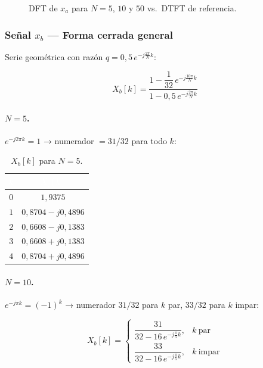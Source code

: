 \documentclass[../Main_Include.tex]{subfiles}
\begin{document}
\begin{figure}[H]
    \centering
    \caption{DFT de $x_a$ para $N = 5$, $10$ y $50$ vs.\ DTFT de referencia.}
\end{figure}

\subsubsection*{Señal $x_b$ — Forma cerrada general}

Serie geométrica con razón $q = 0{,}5\,e^{-j\frac{2\pi}{N}k}$:

\[
    \boxed{X_b[k] = \frac{1 - \dfrac{1}{32}\,e^{-j\frac{10\pi}{N}k}}
                        {1 - 0{,}5\,e^{-j\frac{2\pi}{N}k}}}
\]

\paragraph{$N = 5$.}
$e^{-j2\pi k} = 1$ → numerador $= 31/32$ para todo $k$:

\begin{table}[H]
\centering
\renewcommand{\arraystretch}{1.4}
\begin{tabular}{cc}
\toprule
\rowcolor{azulprinc}
\textcolor{white}{\textbf{$k$}} &
\textcolor{white}{\textbf{$X_b[k]$}} \\
\midrule
\rowcolor{grisclaro}
$0$ & $1{,}9375$ \\
$1$ & $0{,}8704 - j0{,}4896$ \\
\rowcolor{grisclaro}
$2$ & $0{,}6608 - j0{,}1383$ \\
$3$ & $0{,}6608 + j0{,}1383$ \\
\rowcolor{grisclaro}
$4$ & $0{,}8704 + j0{,}4896$ \\
\bottomrule
\end{tabular}
\caption{$X_b[k]$ para $N = 5$.}
\end{table}

\paragraph{$N = 10$.}
$e^{-j\pi k} = (-1)^k$ → numerador $31/32$ para $k$ par, $33/32$ para $k$ impar:

\[
    X_b[k] = \begin{cases}
        \dfrac{31}{32 - 16\,e^{-j\frac{\pi}{5}k}}, & k\ \text{par} \\[8pt]
        \dfrac{33}{32 - 16\,e^{-j\frac{\pi}{5}k}}, & k\ \text{impar}
    \end{cases}
\]
\end{document}
